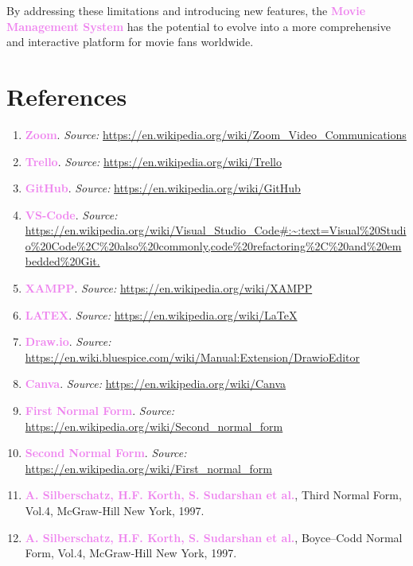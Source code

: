 \documentclass[a4paper,12pt]{article}  %
\renewcommand{\textbf}[1]{\textcolor{violet}{\bfseries #1}}
\begin{document}
By addressing these limitations and introducing new features, the \textbf{Movie Management System} has the potential to evolve into a more comprehensive and interactive platform for movie fans worldwide.



\clearpage




\section{References}
\begin{enumerate}
    \item \textbf{Zoom}. \textit{Source:} \url{https://en.wikipedia.org/wiki/Zoom_Video_Communications}
    \item \textbf{Trello}. \textit{Source:} \url{https://en.wikipedia.org/wiki/Trello}
    \item \textbf{GitHub}. \textit{Source:} \url{https://en.wikipedia.org/wiki/GitHub}
    \item \textbf{VS-Code}. \textit{Source:} \url{https://en.wikipedia.org/wiki/Visual_Studio_Code#:~:text=Visual%20Studio%20Code%2C%20also%20commonly,code%20refactoring%2C%20and%20embedded%20Git.}
    \item \textbf{XAMPP}. \textit{Source:} \url{https://en.wikipedia.org/wiki/XAMPP}
    \item \textbf{LATEX}. \textit{Source:} \url{https://en.wikipedia.org/wiki/LaTeX}
    \item \textbf{Draw.io}. \textit{Source:} \url{https://en.wiki.bluespice.com/wiki/Manual:Extension/DrawioEditor}
    \item \textbf{Canva}. \textit{Source:} \url{https://en.wikipedia.org/wiki/Canva}
    \item \textbf{First Normal Form}. \textit{Source:} \url{https://en.wikipedia.org/wiki/Second_normal_form}
    \item \textbf{Second Normal Form}. \textit{Source:} \url{https://en.wikipedia.org/wiki/First_normal_form}
    \item \textbf{A. Silberschatz, H.F. Korth, S. Sudarshan et al.}, Third Normal Form, Vol.4, McGraw-Hill New York, 1997.
    \item \textbf{A. Silberschatz, H.F. Korth, S. Sudarshan et al.}, Boyce–Codd Normal Form, Vol.4, McGraw-Hill New York, 1997.
\end{enumerate}
\end{document}

